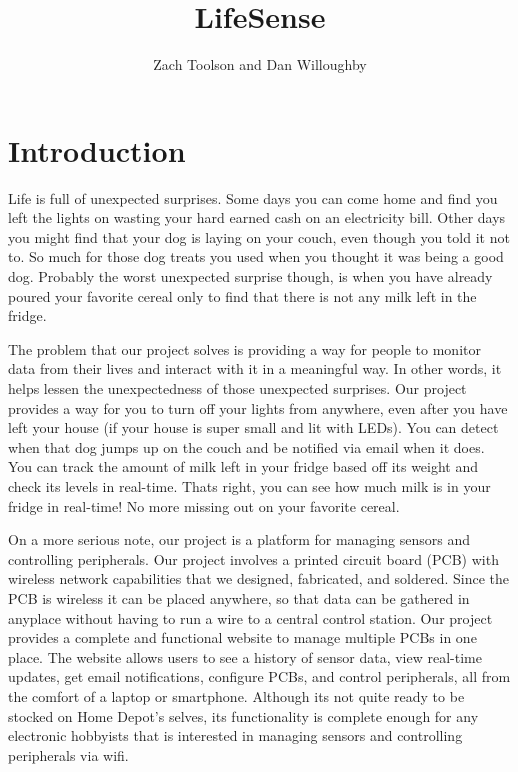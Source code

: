 \documentclass[letterpaper, 12 pt]{article}
\title{\Huge \textbf{LifeSense}}
\author{Zach Toolson and Dan Willoughby }
\begin{document}
\maketitle
\clearpage

\tableofcontents
\clearpage

\section{Introduction}
Life is full of unexpected surprises. Some days you can come home and find you left the lights on wasting your hard earned cash on an electricity bill. Other days you might find that your dog is laying on your couch, even though you told it not to. So much for those dog treats you used when you thought it was being a good dog. Probably the worst unexpected surprise though, is when you have already poured your favorite cereal only to find that there is not any milk left in the fridge.

The problem that our project solves is providing a way for people to monitor data from their lives and interact with it in a meaningful way. In other words, it helps lessen the unexpectedness of those unexpected surprises. Our project provides a way for you to turn off your lights from anywhere, even after you have left your house (if your house is super small and lit with LEDs). You can detect when that dog jumps up on the couch and be notified via email when it does. You can track the amount of milk left in your fridge based off its weight and check its levels in real-time. Thats right, you can see how much milk is in your fridge in real-time! No more missing out on your favorite cereal. 

On a more serious note, our project is a platform for managing sensors and controlling peripherals. Our project involves a printed circuit board (PCB) with wireless network capabilities that we designed, fabricated, and soldered. Since the PCB is wireless it can be placed anywhere, so that data can be gathered in anyplace without having to run a wire to a central control station. Our project provides a complete and functional website to manage multiple PCBs in one place. The website allows users to see a history of sensor data, view real-time updates, get email notifications, configure PCBs, and control peripherals, all from the comfort of a laptop or smartphone. Although its not quite ready to be stocked on Home Depot’s selves, its functionality is complete enough for any electronic hobbyists that is interested in managing sensors and controlling peripherals via wifi. 
\end{document}
